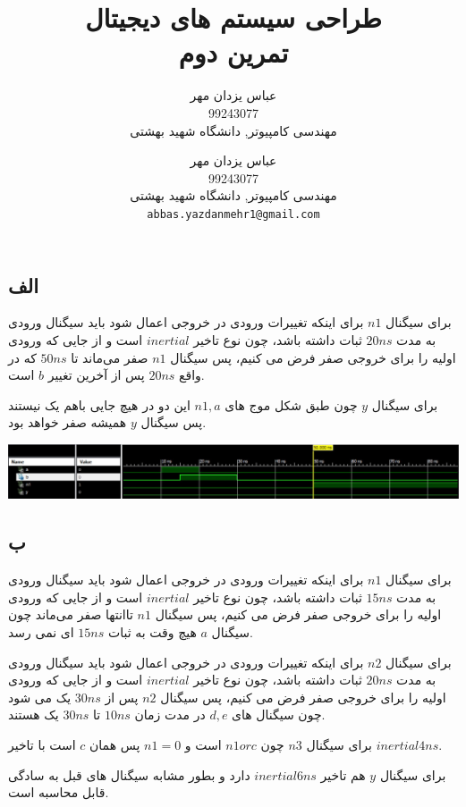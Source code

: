 \documentclass[a4paper]{article}
\author{
عباس یزدان مهر
\\
99243077\\
 مهندسی کامپیوتر, دانشگاه شهید بهشتی
\\
\emailone
	}
\makeatletter
\newcommand{\emailone}{\texttt{abbas.yazdanmehr1@gmail.com}}
\newcommand{\fulltitle}[2]{\title{#1 \\ #2}}
\newcommand{\myinf}{
	\author{
عباس یزدان مهر
\\
99243077\\
 مهندسی کامپیوتر, دانشگاه شهید بهشتی
\\
\emailone
	}
}
\makeatother
\begin{document}
\fulltitle{
طراحی سیستم های دیجیتال
}{
تمرین دوم
}

\myinf

\maketitle

\newpage

\section{}

\subsection*{الف}
برای سیگنال $n1$ برای اینکه تغییرات ورودی در خروجی اعمال شود باید سیگنال ورودی به مدت $20ns$ ثبات داشته باشد، چون نوع تاخیر $inertial$ است و از جایی که ورودی اولیه را برای خروجی صفر فرض می کنیم، پس سیگنال $n1$ صفر می‌ماند تا $50ns$ که در واقع $20ns$ پس از آخرین تغییر $b$ است. 

برای سیگنال $y$ چون طبق شکل موج های $n1, a$ این دو در هیچ جایی باهم یک نیستند پس سیگنال $y$ همیشه صفر خواهد بود.
\begin{center}
\includegraphics[width=15cm]{images/1_a.jpg}
\end{center}

\subsection*{ب}
برای سیگنال $n1$ برای اینکه تغییرات ورودی در خروجی اعمال شود باید سیگنال ورودی به مدت $15ns$ ثبات داشته باشد، چون نوع تاخیر $inertial$ است و از جایی که ورودی اولیه را برای خروجی صفر فرض می کنیم، پس سیگنال $n1$ تاانتها صفر می‌ماند چون سیگنال $a$ هیچ وقت به ثبات $15ns$ ای نمی رسد.

برای سیگنال $n2$ برای اینکه تغییرات ورودی در خروجی اعمال شود باید سیگنال ورودی به مدت $20ns$ ثبات داشته باشد، چون نوع تاخیر $inertial$ است و از جایی که ورودی اولیه را برای خروجی صفر فرض می کنیم، پس سیگنال $n2$ پس از $30ns$ یک می شود چون سیگنال های $d, e$ در مدت زمان $10ns$ تا $30ns$ یک هستند.

برای سیگنال $n3$ چون  $n1 or c$ است و $n1=0$ پس همان $c$ است با تاخیر $inertial 4ns$.

برای سیگنال $y$ هم تاخیر $inertial 6ns$ دارد و بطور مشابه سیگنال های قبل به سادگی قابل محاسبه است.
\end{document}
